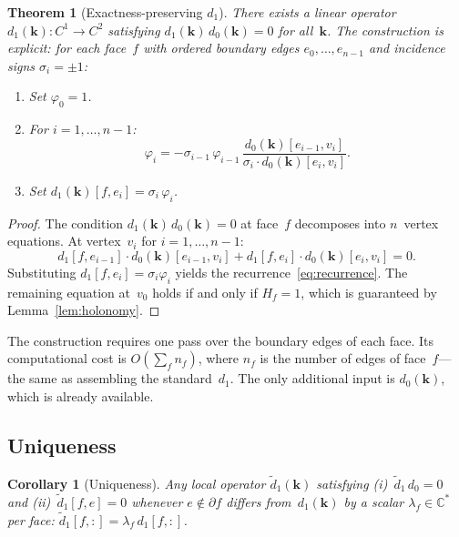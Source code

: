 \documentclass[preprint,12pt]{elsarticle}
\newtheorem{theorem}{Theorem}
\newtheorem{corollary}{Corollary}
\begin{document}
\begin{theorem}[Exactness-preserving $d_1$]\label{thm:exact}
There exists a linear operator $d_1(\mathbf{k})\colon C^1 \to C^2$ satisfying $d_1(\mathbf{k})\,d_0(\mathbf{k}) = 0$ for all~$\mathbf{k}$. The construction is explicit: for each face~$f$ with ordered boundary edges $e_0, \ldots, e_{n-1}$ and incidence signs $\sigma_i = \pm 1$:
\begin{enumerate}
  \item Set $\varphi_0 = 1$.
  \item For $i = 1, \ldots, n{-}1$:
  \begin{equation}\label{eq:recurrence}
    \varphi_i = -\sigma_{i-1}\,\varphi_{i-1}\,\frac{d_0(\mathbf{k})[e_{i-1}, v_i]}{\sigma_i \cdot d_0(\mathbf{k})[e_i, v_i]}.
  \end{equation}
  \item Set $d_1(\mathbf{k})[f, e_i] = \sigma_i\,\varphi_i$.
\end{enumerate}
\end{theorem}

\begin{proof}
The condition $d_1(\mathbf{k})\,d_0(\mathbf{k}) = 0$ at face~$f$ decomposes into $n$~vertex equations. At vertex~$v_i$ for $i = 1, \ldots, n{-}1$:
\begin{equation}
  d_1[f, e_{i-1}] \cdot d_0(\mathbf{k})[e_{i-1}, v_i] + d_1[f, e_i] \cdot d_0(\mathbf{k})[e_i, v_i] = 0.
\end{equation}
Substituting $d_1[f, e_i] = \sigma_i\varphi_i$ yields the recurrence~\eqref{eq:recurrence}. The remaining equation at~$v_0$ holds if and only if $H_f = 1$, which is guaranteed by Lemma~\ref{lem:holonomy}.
\end{proof}

The construction requires one pass over the boundary edges of each face. Its computational cost is $O(\sum_f n_f)$, where $n_f$ is the number of edges of face~$f$---the same as assembling the standard~$d_1$. The only additional input is $d_0(\mathbf{k})$, which is already available.

\subsection{Uniqueness}

\begin{corollary}[Uniqueness]\label{cor:unique}
Any local operator $\tilde{d}_1(\mathbf{k})$ satisfying (i)~$\tilde{d}_1\,d_0 = 0$ and (ii)~$\tilde{d}_1[f,e] = 0$ whenever $e \notin \partial f$ differs from~$d_1(\mathbf{k})$ by a scalar $\lambda_f \in \mathbb{C}^*$ per face: $\tilde{d}_1[f,:] = \lambda_f\,d_1[f,:]$.
\end{corollary}
\end{document}
